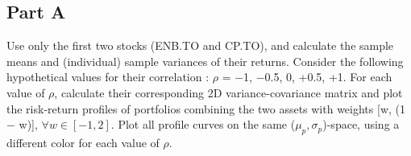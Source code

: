 \documentclass[
  oneside]{book}
\begin{document}
\hypertarget{part-a-7}{%
\subsection{Part A}\label{part-a-7}}

Use only the first two stocks (ENB.TO and CP.TO), and calculate the sample means and (individual) sample variances of their returns. Consider the following hypothetical values for their correlation : \(\rho\) = −1, −0.5, 0, +0.5, +1.
For each value of \(\rho\), calculate their corresponding 2D variance-covariance matrix and plot the risk-return profiles of portfolios combining the two assets with weights {[}w, (1 − w){]}, \(\forall w \in [−1, 2]\). Plot all profile curves on the same (\(\mu_p, \sigma_p\))-space, using a different color for each value of \(\rho\).
\end{document}
